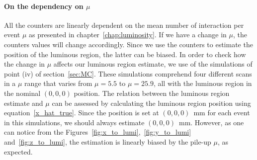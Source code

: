 \paragraph{On the dependency on $\mu$}\label{sec:mu_dependency}
All the counters are linearly dependent on the mean number of interaction per event $\mu$ as presented in chapter~\ref{chap:luminosity}. If we have a change in $\mu$, the counters values will change accordingly. Since we use the counters to estimate the position of the luminous region, the latter can be biased. In order to check how the change in $\mu$ affects our luminous region estimate, we  use of the simulations of point (iv) of section~\ref{sec:MC}. These simulations comprehend four different scans in a $\mu$ range that varies from $\mu=5.5$ to $\mu=25.9$, all with the luminous region in the nominal $(0,0,0)$ position. 
The relation between the luminous region estimate and $\mu$ can be assessed by calculating the luminous region position using equation~\eqref{x_hat_true}. Since the position is set at $(0,0,0)$~mm for each event in this simulations, we should always estimate $(0,0,0)$~mm. However, as one can notice from the Figures~\ref{fig:x_to_lumi},~\ref{fig:y_to_lumi} and~\ref{fig:z_to_lumi}, the estimation is linearly biased by the pile-up $\mu$, as expected. 
